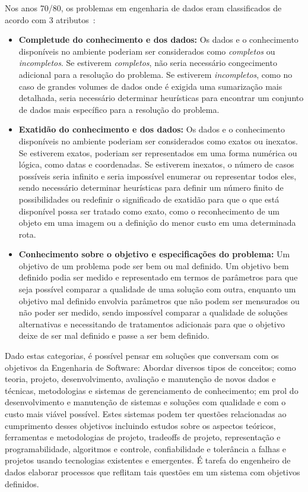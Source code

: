 \documentclass[portugues]{ic-tese}
\begin{document}
Nos anos 70/80, os problemas em engenharia de dados eram classificados de acordo com 3 atributos~\citep{IEEE_1989}:

\begin{itemize}
\item \textbf{Completude do conhecimento e dos dados:} Os dados e o conhecimento disponíveis no ambiente poderiam ser considerados como \textit{completos} ou \textit{incompletos}. Se estiverem \textit{completos}, não seria necessário congecimento adicional para a resolução do problema. Se estiverem \textit{incompletos}, como no caso de grandes volumes de dados onde é exigida uma sumarização mais detalhada, seria necessário determinar heurísticas para encontrar um conjunto de dados mais específico para a resolução do problema.
\item \textbf{Exatidão do conhecimento e dos dados:} Os dados e o conhecimento disponíveis no ambiente poderiam ser considerados como exatos ou inexatos. Se estiverem exatos, poderiam ser representados em uma forma numérica ou lógica, como datas e coordenadas. Se estiverem inexatos, o número de casos possíveis seria infinito e seria impossível enumerar ou representar todos eles, sendo necessário determinar heurísticas para definir um número finito de possibilidades ou redefinir o significado de exatidão para que o que está disponível possa ser tratado como exato, como o reconhecimento de um objeto em uma imagem ou a definição do menor custo em uma determinada rota.
\item \textbf{Conhecimento sobre o objetivo e especificações do problema:} Um objetivo de um problema pode ser bem ou mal definido. Um objetivo bem definido podia ser medido e representado em termos de parâmetros para que seja possível comparar a qualidade de uma solução com outra, enquanto um objetivo mal definido envolvia parâmetros que não podem ser mensurados ou não poder ser medido, sendo impossível comparar a qualidade de soluções alternativas e necessitando de tratamentos adicionais para que o objetivo deixe de ser mal definido e passe a ser bem definido. 
\end{itemize}

Dado estas categorias, é possível pensar em soluções que conversam com os objetivos da Engenharia de Software: Abordar diversos tipos de conceitos; como teoria, projeto, desenvolvimento, avaliação e manutenção de novos dados e técnicas, metodologias e sistemas de gerenciamento de conhecimento; em prol do desenvolvimento e manutenção de sistemas e soluções com qualidade e com o custo mais viável possível. Estes sistemas podem ter questões relacionadas ao cumprimento desses objetivos incluindo estudos sobre os aspectos teóricos, ferramentas e metodologias de projeto, tradeoffs de projeto, representação e programabilidade, algoritmos e controle, confiabilidade e tolerância a falhas e projetos usando tecnologias existentes e emergentes. É tarefa do engenheiro de dados elaborar processos que reflitam tais questões em um sistema com objetivos definidos.
\end{document}
